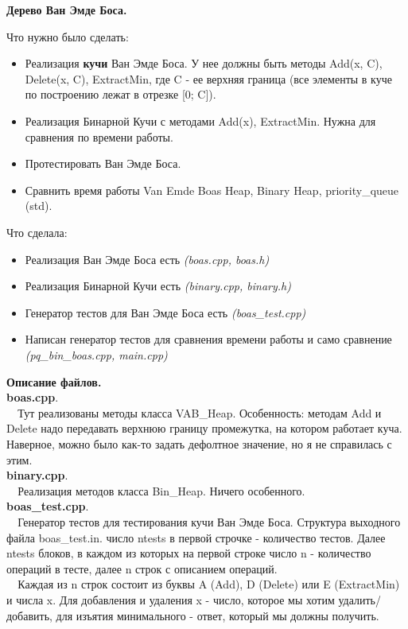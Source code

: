 \documentclass[12pt]{article}
\begin{document}
	\begin{center}
		\textbf{\huge Дерево Ван Эмде Боса.}
	\end{center}
	Что нужно было сделать:
	\begin{itemize}
		\item Реализация \textbf{кучи} Ван Эмде Боса. У нее должны быть методы Add(x, C), Delete(x, C), ExtractMin, где C - ее верхняя граница (все элементы в куче по построению лежат в отрезке [0; C]).
		\item Реализация Бинарной Кучи с методами Add(x), ExtractMin. Нужна для сравнения по времени работы.
		\item Протестировать Ван Эмде Боса.
		\item Сравнить время работы Van Emde Boas Heap, Binary Heap, priority\_queue (std).
	\end{itemize}
	Что сделала:
	\begin{itemize}
		\item Реализация Ван Эмде Боса есть \textit{(boas.cpp, boas.h)}
		\item Реализация Бинарной Кучи есть \textit{(binary.cpp, binary.h)}
		\item Генератор тестов для Ван Эмде Боса есть \textit{(boas\_test.cpp)}
		\item Написан генератор тестов для сравнения времени работы и само сравнение \textit{(pq\_bin\_boas.cpp, main.cpp)}
	\end{itemize}
\pagebreak
	\textbf{\Large Описание файлов.}\\
	\textbf{boas.cpp}.\\
	\verb'  'Тут реализованы методы класса VAB\_Heap. Особенность: методам Add и Delete надо передавать верхнюю границу промежутка, на котором работает куча. Наверное, можно было как-то задать дефолтное значение, но я не справилась с этим.\\
	\textbf{binary.cpp}.\\
	\verb'  'Реализация методов класса Bin\_Heap. Ничего особенного.\\
	\textbf{boas\_test.cpp}.\\
	\verb'  'Генератор тестов для тестирования кучи Ван Эмде Боса. Структура выходного файла boas\_test.in.
	число ntests в первой строчке - количество тестов. Далее ntests блоков, в каждом из которых на первой строке число n - количество операций в тесте, далее n строк с описанием операций.\\
	\verb'  'Каждая из n строк состоит из буквы A (Add), D (Delete) или E (ExtractMin) и числа x. Для добавления и удаления x - число, которое мы хотим удалить/добавить, для изъятия минимального - ответ, который мы должны получить.\\
\end{document}
